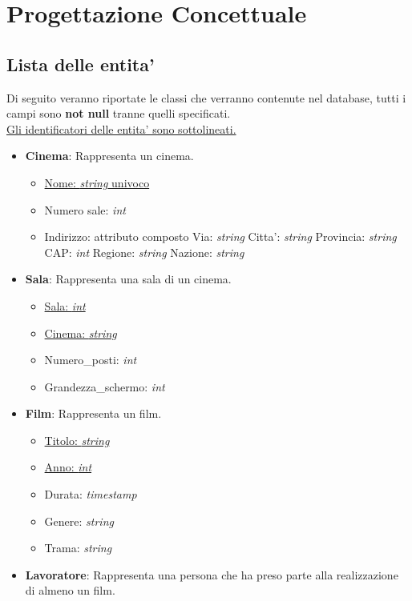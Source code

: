 \documentclass[10pt]{article}
\begin{document}
	\section{Progettazione Concettuale}	
	\subsection{Lista delle entita'}
	Di seguito veranno riportate le classi che verranno contenute nel database, tutti i campi sono \textbf{not null} tranne quelli specificati.\\
	\underline{Gli identificatori delle entita' sono sottolineati.}
	\begin{itemize}
		\item \textbf{Cinema}: Rappresenta un cinema.
		\begin{itemize}
			\item \underline{Nome: \textit{string} univoco}
			\item Numero sale: \textit{int}
			\item Indirizzo: attributo composto
				\subitem Via: \textit{string}
				\subitem Citta': \textit{string}
				\subitem Provincia: \textit{string}
				\subitem CAP: \textit{int}
				\subitem Regione: \textit{string}
				\subitem Nazione: \textit{string}			
		\end{itemize}
		\item \textbf{Sala}: Rappresenta una sala di un cinema.
		\begin{itemize}
			\item \underline{Sala: \textit{int}}
			\item \underline{Cinema: \textit{string}}
			\item Numero\_posti: \textit{int}
			\item Grandezza\_schermo: \textit{int}
		\end{itemize}
		\item \textbf{Film}: Rappresenta un film.
		\begin{itemize}
			\item \underline{Titolo: \textit{string}}
			\item \underline{Anno: \textit{int}}
			\item Durata: \textit{timestamp}
			\item Genere: \textit{string}
			\item Trama: \textit{string}
		\end{itemize}
		\item \textbf{Lavoratore}: Rappresenta una persona che ha preso parte alla realizzazione di almeno un film.

\end{itemize}
\end{document}

